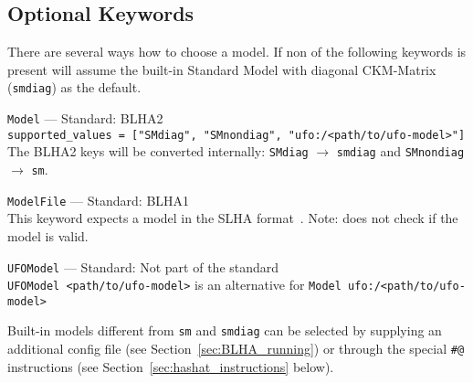 \subsection{Optional Keywords}\label{sec:optional_BLHA_keywords}
There are several ways how to choose a model. If non of the following keywords is present \gosam will assume the built-in Standard Model with diagonal CKM-Matrix (\texttt{smdiag}) as the default.
\begin{basedescript}{\desclabelstyle{\pushlabel}}
    \item[\hspace{-1em}]\colorbox{gray!30}{\lstinline[style=in]|Model|} --- Standard: BLHA2\vspace{0.1cm}\\
        \lstinline[style=in]|supported_values = ["SMdiag", "SMnondiag", "ufo:/<path/to/ufo-model>"]|\\
        The BLHA2 keys will be converted internally: \texttt{SMdiag} $\to$ \texttt{smdiag} and \texttt{SMnondiag} $\to$ \texttt{sm}.
    \item[\hspace{-1em}]\colorbox{gray!30}{\lstinline[style=in]|ModelFile|} --- Standard: BLHA1\vspace{0.1cm}\\
        This keyword expects a model in the SLHA format~\cite{Skands:2003cj,Allanach:2008qq}. Note: \gosam does not check if the model is valid.
    \item[\hspace{-1em}]\colorbox{gray!30}{\lstinline[style=in]|UFOModel|} --- Standard: Not part of the standard\vspace{0.1cm}\\
        \lstinline[style=in]|UFOModel <path/to/ufo-model>| is an alternative for \lstinline[style=in]|Model ufo:/<path/to/ufo-model>|
\end{basedescript}
Built-in models different from \texttt{sm} and \texttt{smdiag} can be selected by supplying an additional config file (see Section~\ref{sec:BLHA_running}) or through the special \texttt{\#@} instructions (see Section~\ref{sec:hashat_instructions} below).\\

